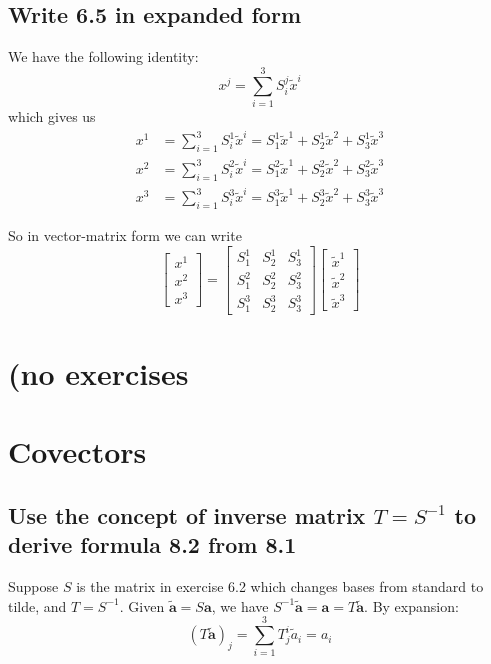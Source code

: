 \documentclass{article}
\begin{document}
\subsection{Write 6.5 in expanded form}
We have the following identity:
$$x^j = \sum_{i=1}^3 S_i^j \tilde{x}^i $$
which gives us
\begin{align*}
	x^1 &= \sum_{i=1}^3 S_i^1 \tilde{x}^i = S^1_1 \tilde{x}^1 + S^1_2 \tilde{x}^2 + S_3^1 \tilde{x}^3\\
	x^2 &= \sum_{i=1}^3 S_i^2 \tilde{x}^i = S_1^2 \tilde{x}^1 + S_2^2 \tilde{x}^2 + S_3^2 \tilde{x}^3\\
	x^3 &= \sum_{i=1}^3 S_i^3 \tilde{x}^i = S_1^3 \tilde{x}^1 + S_2^3 \tilde{x}^2 + S_3^3 \tilde{x}^3
\end{align*}

So in vector-matrix form we can write
$$\begin{bmatrix}
	x^1 \\ x^2 \\ x^3 
\end{bmatrix} =
\begin{bmatrix}
	S^1_1 & S^1_2 & S^1_3 \\
	S^2_1 & S^2_2 & S^2_3 \\
	S^3_1 & S^3_2 & S^3_3
\end{bmatrix}
\begin{bmatrix}
	\tilde{x}^1 \\ \tilde{x}^2 \\ \tilde{x}^3
\end{bmatrix}
$$

\section{(no exercises}
\section{Covectors}

\subsection{Use the concept of inverse matrix $T = S^{-1}$ to derive formula 8.2 from 8.1}

Suppose $S$ is the matrix in exercise 6.2 which changes bases from standard to tilde, and $T = S^{-1}$. Given $\tilde{\mathbf{a}} = S\mathbf{a}$, we have $S^{-1}\tilde{\mathbf{a}} = \mathbf{a} = T\tilde{\mathbf{a}}$. By expansion:
$$(T\tilde{\mathbf{a}})_j= \sum_{i=1}^3 T^i_j \tilde{a}_i = a_i$$
\end{document}
